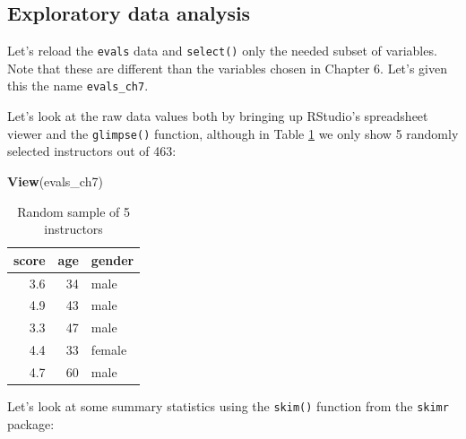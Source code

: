 \documentclass[12pt,]{krantz}
\makeatletter
\newenvironment{Shaded}{\begin{snugshade}}{\end{snugshade}}
\newcommand{\KeywordTok}[1]{\textcolor[rgb]{0.27,0.27,0.27}{\textbf{#1}}}
\newcommand{\StringTok}[1]{\textcolor[rgb]{0.5,0.5,0.5}{#1}}
\newcommand{\OperatorTok}[1]{\textcolor[rgb]{0.43,0.43,0.43}{\textbf{#1}}}
\newcommand{\NormalTok}[1]{#1}
\newenvironment{kframe}{%
\medskip{}
\setlength{\fboxsep}{.8em}
 \def\at@end@of@kframe{}%
 \ifinner\ifhmode%
  \def\at@end@of@kframe{\end{minipage}}%
  \begin{minipage}{\columnwidth}%
 \fi\fi%
 \def\FrameCommand##1{\hskip\@totalleftmargin \hskip-\fboxsep
 \colorbox{shadecolor}{##1}\hskip-\fboxsep
     \hskip-\linewidth \hskip-\@totalleftmargin \hskip\columnwidth}%
 \MakeFramed {\advance\hsize-\width
   \@totalleftmargin\z@ \linewidth\hsize
   \@setminipage}}%
 {\par\unskip\endMakeFramed%
 \at@end@of@kframe}
\renewenvironment{Shaded}{\begin{kframe}}{\end{kframe}}
\theoremstyle{definition}
\theoremstyle{definition}
\theoremstyle{definition}
\theoremstyle{remark}
\makeatother
\begin{document}
\subsection{Exploratory data analysis}\label{model4EDA}

Let's reload the \texttt{evals} data and \texttt{select()} only the
needed subset of variables. Note that these are different than the
variables chosen in Chapter 6. Let's given this the name
\texttt{evals\_ch7}.

\begin{Shaded}
\end{Shaded}

Let's look at the raw data values both by bringing up RStudio's
spreadsheet viewer and the \texttt{glimpse()} function, although in
Table \ref{tab:model4-data-preview} we only show 5 randomly selected
instructors out of 463:

\begin{Shaded}
\begin{Highlighting}[]
\KeywordTok{View}\NormalTok{(evals_ch7)}
\end{Highlighting}
\end{Shaded}

\begin{table}[H]

\caption{\label{tab:model4-data-preview}Random sample of 5 instructors}
\centering
\fontsize{10}{12}\selectfont
\begin{tabular}[t]{rrl}
\toprule
score & age & gender\\
\midrule
3.6 & 34 & male\\
4.9 & 43 & male\\
3.3 & 47 & male\\
4.4 & 33 & female\\
4.7 & 60 & male\\
\bottomrule
\end{tabular}
\end{table}

Let's look at some summary statistics using the \texttt{skim()} function
from the \texttt{skimr} package:

\begin{Shaded}
\end{Shaded}
\end{document}
